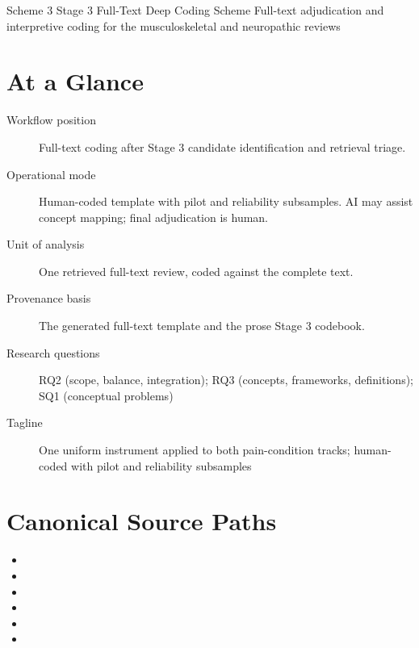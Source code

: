 \documentclass[11pt]{article}
\begin{document}
\schemeheader
  {Scheme 3}
  {Stage 3 Full-Text Deep Coding Scheme}
  {Full-text adjudication and interpretive coding for the musculoskeletal and neuropathic reviews}


\section*{At a Glance}
\begin{description}
\item[Workflow position] Full-text coding after Stage 3 candidate identification and retrieval triage.
\item[Operational mode] Human-coded template with pilot and reliability subsamples. AI may assist concept mapping; final adjudication is human.
\item[Unit of analysis] One retrieved full-text review, coded against the complete text.
\item[Provenance basis] The generated full-text template and the prose Stage 3 codebook.
\item[Research questions] RQ2 (scope, balance, integration); RQ3 (concepts, frameworks, definitions); SQ1 (conceptual problems)
\item[Tagline] One uniform instrument applied to both pain-condition tracks; human-coded with pilot and reliability subsamples
\end{description}

\section*{Canonical Source Paths}
\begin{itemize}
\item {}
\item {}
\item {}
\item {}
\item {}
\item {}
\end{itemize}
\end{document}
